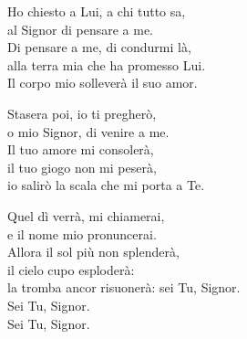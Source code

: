 
\strofa Ho chiesto a Lui, a chi tutto sa,\\
al Signor di pensare a me.\\
Di pensare a me, di condurmi là,\\
alla terra mia che ha promesso Lui.\\
Il corpo mio solleverà il suo amor.

\spazio

\strofa Stasera poi, io ti pregherò,\\
o mio Signor, di venire a me.\\
Il tuo amore mi consolerà,\\
il tuo giogo non mi peserà,\\
io salirò la scala che mi porta a Te.

\spazio

\strofa Quel dì verrà, mi chiamerai,\\
e il nome mio pronuncerai.\\
Allora il sol più non splenderà,\\
il cielo cupo esploderà:\\
la tromba ancor risuonerà: sei Tu, Signor.\\
Sei Tu, Signor.\\
Sei Tu, Signor.